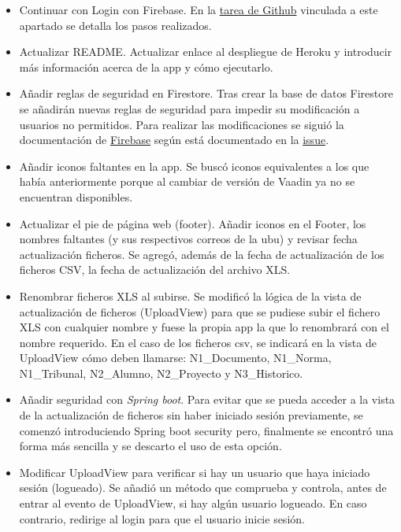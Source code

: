 \begin{itemize}
	\item Continuar con Login con Firebase.
		En la \href{https://github.com/dbo1001/Gestor-TFG-2021/issues/122}{tarea de Github} vinculada a este apartado se detalla los pasos realizados.
	\item Actualizar README.
		Actualizar enlace al despliegue de Heroku y introducir más información acerca de la app y cómo ejecutarlo.
	\item Añadir reglas de seguridad en Firestore.
		Tras crear la base de datos Firestore se añadirán nuevas reglas de seguridad para impedir su modificación a usuarios no permitidos. Para realizar las modificaciones se siguió la documentación de \href{https://firebase.google.com/docs/firestore/security/insecure-rules}{Firebase} según está documentado en la \href{https://github.com/dbo1001/Gestor-TFG-2021/issues/130}{issue}.
	\item Añadir iconos faltantes en la app.
		Se buscó iconos equivalentes a los que había anteriormente porque al cambiar de versión de Vaadin ya no se encuentran disponibles.
	\item Actualizar el pie de página web (footer).
		Añadir iconos en el Footer, los nombres faltantes (y sus respectivos correos de la ubu) y revisar fecha actualización ficheros. Se agregó, además de la fecha de actualización de los ficheros CSV, la fecha de actualización del archivo XLS.
	\item Renombrar ficheros XLS al subirse.
		Se modificó la lógica de la vista de actualización de ficheros (UploadView) para que se pudiese subir el fichero XLS con cualquier nombre y fuese la propia app la que lo renombrará con el nombre requerido. En el caso de los ficheros csv, se indicará en la vista de UploadView cómo deben llamarse: N1\_Documento, N1\_Norma, N1\_Tribunal, N2\_Alumno, N2\_Proyecto y N3\_Historico.
	\item Añadir seguridad con \emph{Spring boot}.
		Para evitar que se pueda acceder a la vista de la actualización de ficheros sin haber iniciado sesión previamente, se comenzó introduciendo Spring boot security pero, finalmente se encontró una forma más sencilla y se descarto el uso de esta opción.
	\item Modificar UploadView para verificar si hay un usuario que haya iniciado sesión (logueado).
		Se añadió un método que comprueba y controla, antes de entrar al evento de UploadView, si hay algún usuario logueado. En caso contrario, redirige al login para que el usuario inicie sesión. 
	
\end{itemize}

